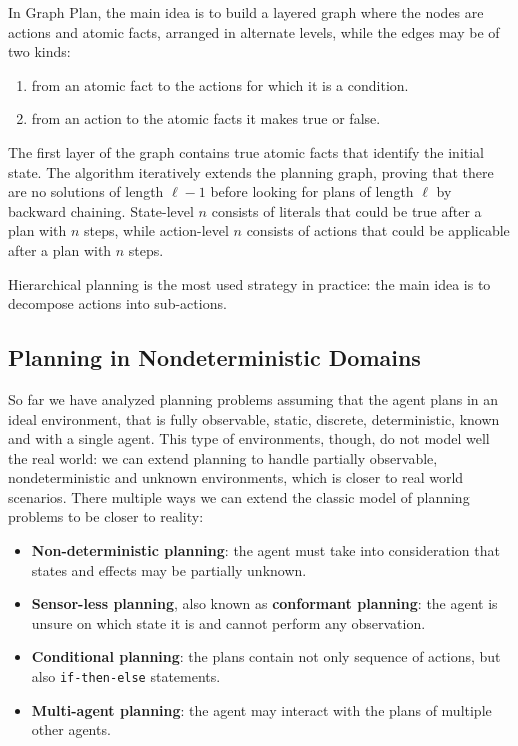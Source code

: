 \documentclass{article}
\newcommand{\code}{\lstinline}
\begin{document}
In Graph Plan, the main idea is to build a layered graph where the nodes are actions and atomic facts, arranged in alternate levels, while the edges may be of two kinds:
\begin{enumerate}
    \item from an atomic fact to the actions for which it is a condition.
    \item from an action to the atomic facts it makes true or false.
\end{enumerate}

\noindent
The first layer of the graph contains true atomic facts that identify the initial state. The algorithm iteratively extends the planning graph, proving that there are no solutions of length $\ell-1$ before looking for plans of length $\ell$ by backward chaining. State-level $n$ consists of literals that could be true after a plan with $n$ steps, while action-level $n$ consists of actions that could be applicable after a plan with $n$ steps.

Hierarchical planning is the most used strategy in practice: the main idea is to decompose actions into sub-actions.

\subsection{Planning in Nondeterministic Domains}
So far we have analyzed planning problems assuming that the agent plans in an ideal environment, that is fully observable, static, discrete, deterministic, known and with a single agent. This type of environments, though, do not model well the real world: we can extend planning to handle partially observable, nondeterministic and unknown environments, which is closer to real world scenarios. There multiple ways we can extend the classic model of planning problems to be closer to reality:
\begin{itemize}
    \item \textbf{Non-deterministic planning}: the agent must take into consideration that states and effects may be partially unknown.
    \item \textbf{Sensor-less planning}, also known as \textbf{conformant planning}: the agent is unsure on which state it is and cannot perform any observation.
    \item \textbf{Conditional planning}: the plans contain not only sequence of actions, but also \code{if-then-else} statements.
    \item \textbf{Multi-agent planning}: the agent may interact with the plans of multiple other agents.
\end{itemize}
\end{document}
